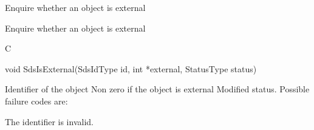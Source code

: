 \begin{manroutinedescription}
      Enquire whether an object is external

      Enquire whether an object is external

      C

      void SdsIsExternal(SdsIdType id, int *external, StatusType {\mantt{*}} {%
} status)

\begin{manparametertable}
 Identifier of the object
 Non zero if the %
object is external
 Modified status. Possible %
failure codes are:
\end{manparametertable}
\begin{mantwocolumntable}
The identifier is invalid.
\end{mantwocolumntable}
\end{manroutinedescription}
